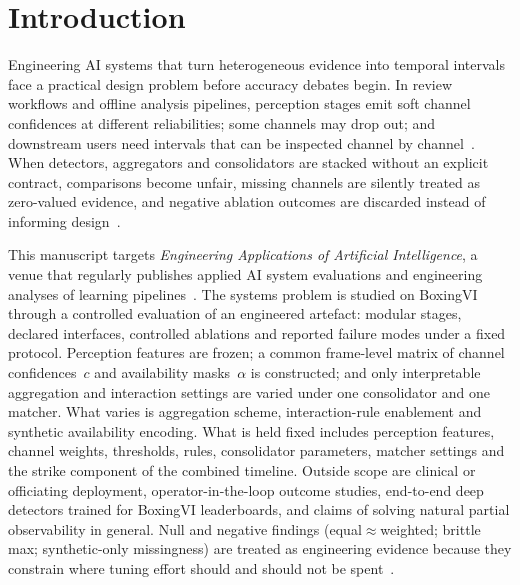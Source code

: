 \documentclass[preprint,12pt,numbers,sort&compress]{elsarticle}
\begin{document}
\section{Introduction}
\label{sec:introduction}
\label{sec:positioning}

Engineering AI systems that turn heterogeneous evidence into temporal intervals face a practical design problem before accuracy debates begin.
In review workflows and offline analysis pipelines, perception stages emit soft channel confidences at different reliabilities; some channels may drop out; and downstream users need intervals that can be inspected channel by channel~\cite{duan2019ai,doshi2017towards,rudin2019interpretable}.
When detectors, aggregators and consolidators are stacked without an explicit contract, comparisons become unfair, missing channels are silently treated as zero-valued evidence, and negative ablation outcomes are discarded instead of informing design~\cite{pineau2021reproducibility,kapoor2023leakage}.

This manuscript targets \emph{Engineering Applications of Artificial Intelligence}, a venue that regularly publishes applied AI system evaluations and engineering analyses of learning pipelines~\cite{ganaie2022ensemble}.
The systems problem is studied on BoxingVI~\cite{kumar2025boxingvi} through a controlled evaluation of an engineered artefact: modular stages, declared interfaces, controlled ablations and reported failure modes under a fixed protocol.
Perception features are frozen; a common frame-level matrix of channel confidences~$c$ and availability masks~$\alpha$ is constructed; and only interpretable aggregation and interaction settings are varied under one consolidator and one matcher.
What varies is aggregation scheme, interaction-rule enablement and synthetic availability encoding.
What is held fixed includes perception features, channel weights, thresholds, rules, consolidator parameters, matcher settings and the strike component of the combined timeline.
Outside scope are clinical or officiating deployment, operator-in-the-loop outcome studies, end-to-end deep detectors trained for BoxingVI leaderboards, and claims of solving natural partial observability in general.
Null and negative findings (equal$\approx$weighted; brittle max; synthetic-only missingness) are treated as engineering evidence because they constrain where tuning effort should and should not be spent~\cite{lipton2018mythos,pineau2021reproducibility}.
\end{document}
